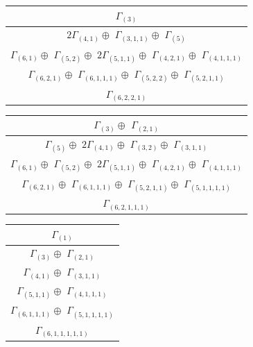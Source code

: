 \documentclass[main.tex]{subfiles}
\begin{document}
\bigskip
\begin{minipage}{.5\textwidth}
\centering
\begin{tabular}{c}
$\Gamma_{(
3
)}$
\\ \hline
$2\Gamma_{(
4 , 
1
)} \oplus$
$\Gamma_{(
3 , 
1 , 
1
)} \oplus$
$\Gamma_{(
5
)} $
\\ \hline
$\Gamma_{(
6 , 
1
)} \oplus$
$\Gamma_{(
5 , 
2
)} \oplus$
$2\Gamma_{(
5 , 
1 , 
1
)} \oplus$
$\Gamma_{(
4 , 
2 , 
1
)} \oplus$
$\Gamma_{(
4 , 
1 , 
1 , 
1
)}$
\\ \hline
$\Gamma_{(
6 , 
2 , 
1
)} \oplus$
$\Gamma_{(
6 , 
1 , 
1 , 
1
)} \oplus$
$\Gamma_{(
5 , 
2 , 
2
)} \oplus$
$\Gamma_{(
5 , 
2 , 
1 , 
1
)}$
\\ \hline
$\Gamma_{(
6 , 
2 , 
2 , 
1
)}$
\\
\end{tabular}\end{minipage}
\begin{minipage}{.5\textwidth}
\centering
\begin{tabular}{c}
$\Gamma_{(
3
)} \oplus$
$\Gamma_{(
2 , 
1
)}$
\\ \hline
$\Gamma_{(
5
)} \oplus$
$2\Gamma_{(
4 , 
1
)} \oplus$
$\Gamma_{(
3 , 
2
)} \oplus$
$\Gamma_{(
3 , 
1 , 
1
)}$
\\ \hline
$\Gamma_{(
6 , 
1
)} \oplus$
$\Gamma_{(
5 , 
2
)} \oplus$
$2\Gamma_{(
5 , 
1 , 
1
)} \oplus$
$\Gamma_{(
4 , 
2 , 
1
)} \oplus$
$\Gamma_{(
4 , 
1 , 
1 , 
1
)}$
\\ \hline
$\Gamma_{(
6 , 
2 , 
1
)} \oplus$
$\Gamma_{(
6 , 
1 , 
1 , 
1
)} \oplus$
$\Gamma_{(
5 , 
2 , 
1 , 
1
)} \oplus$
$\Gamma_{(
5 , 
1 , 
1 , 
1 , 
1
)}$
\\ \hline
$\Gamma_{(
6 , 
2 , 
1 , 
1 , 
1
)}$
\\
\end{tabular}\end{minipage}
\bigskip
\begin{minipage}{.2\textwidth}
\centering
\begin{tabular}{c}
$\Gamma_{(
1
)}$
\\ \hline
$\Gamma_{(
3
)} \oplus$
$\Gamma_{(
2 , 
1
)}$
\\ \hline
$\Gamma_{(
4 , 
1
)} \oplus$
$\Gamma_{(
3 , 
1 , 
1
)}$
\\ \hline
$\Gamma_{(
5 , 
1 , 
1
)} \oplus$
$\Gamma_{(
4 , 
1 , 
1 , 
1
)}$
\\ \hline
$\Gamma_{(
6 , 
1 , 
1 , 
1
)} \oplus$
$\Gamma_{(
5 , 
1 , 
1 , 
1 , 
1
)}$
\\ \hline
$\Gamma_{(
6 , 
1 , 
1 , 
1 , 
1 , 
1
)}$
\\
\end{tabular}\end{minipage}
\end{document}
